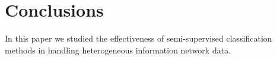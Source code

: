 \section{Conclusions}
In this paper we studied the effectiveness of semi-supervised classification methods in handling heterogeneous information network data.
\label{sec:conclusion}
